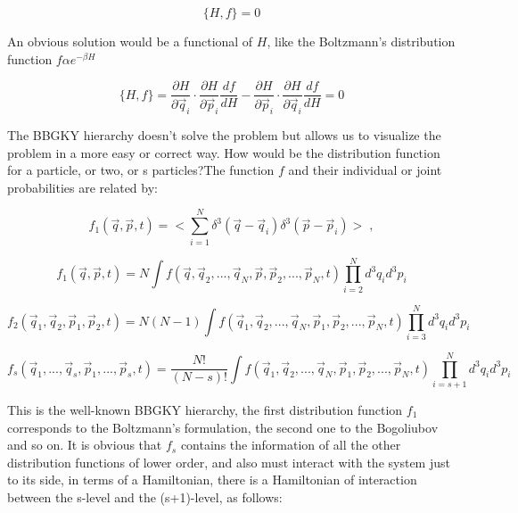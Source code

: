 \documentclass[spanish,notitlepage,letterpaper,11pt]{article} %
\numberwithin{equation}{subsection}
\begin{document}
        \begin{equation}
            \{H,f\} = 0
        \end{equation}

        An obvious solution would be a functional of $H$, like the Boltzmann's distribution function $f \alpha e^{-\beta H}$

        \begin{equation}
            \{H,f\} = \frac{\partial H}{\partial \Vec{q}_i}\cdot \frac{\partial H}{\partial \Vec{p}_i}\frac{df}{dH} - \frac{\partial H}{\partial \Vec{p}_i}\cdot \frac{\partial H}{\partial \Vec{q}_i}\frac{df}{dH} = 0
        \end{equation}

        The BBGKY hierarchy doesn't solve the problem but allows us to visualize the problem in a more easy or correct way. How would be the distribution function for a particle, or two, or s particles?The function $f$ and their individual or joint probabilities are related by:

        \begin{equation}
            f_1(\Vec{q},\Vec{p},t) = <\sum_{i=1}^N \delta^3(\Vec{q}-\Vec{q}_i)\delta^3(\Vec{p}-\Vec{p}_i)>\;,
        \end{equation}

        \begin{equation}
            f_1(\Vec{q},\Vec{p},t) = N \int f(\Vec{q},\Vec{q}_2,...,\Vec{q}_N,\Vec{p},\Vec{p}_2,...,\Vec{p}_N,t)\prod_{i=2}^Nd^3q_id^3p_i
        \end{equation}

        \begin{equation}
            f_2(\Vec{q}_1 , \Vec{q}_2,\Vec{p}_1, \Vec{p}_2 ,t) = N(N-1) \int f(\Vec{q}_1,\Vec{q}_2,...,\Vec{q}_N,\Vec{p}_1,\Vec{p}_2,...,\Vec{p}_N,t)\prod_{i=3}^Nd^3q_id^3p_i
        \end{equation}

        \begin{equation}
            f_s(\Vec{q}_1 ,..., \Vec{q}_s,\Vec{p}_1, ..., \Vec{p}_s ,t) = \frac{N!}{(N-s)!} \int f(\Vec{q}_1,\Vec{q}_2,...,\Vec{q}_N,\Vec{p}_1,\Vec{p}_2,...,\Vec{p}_N,t)\prod_{i=s+1}^Nd^3q_id^3p_i
        \end{equation}

        This is the well-known BBGKY hierarchy, the first distribution function $f_1$ corresponds to the Boltzmann's formulation, the second one to the Bogoliubov and so on. It is obvious that $f_s$ contains the information of all the other distribution functions of lower order, and also must interact with the system just to its side, in terms of a Hamiltonian, there is a Hamiltonian of interaction between the s-level and the 
        (s+1)-level, as follows:
\end{document}
